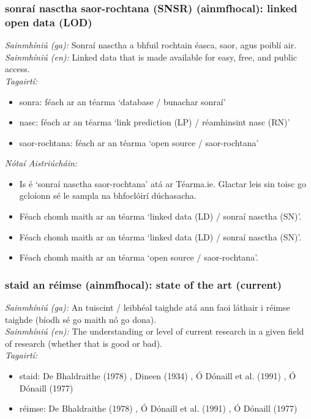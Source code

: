 \subsubsection*{sonraí nasctha saor-rochtana (SNSR) (ainmfhocal): linked open data (LOD)}
 \noindent \textit{Sainmhíniú (ga):} Sonraí nasctha a bhfuil rochtain éasca, saor, agus poiblí air.
\\
 \noindent \textit{Sainmhíniú (en):} Linked data that is made available for easy, free, and public access.
\\
 \noindent \textit{Tagairtí:}
\begin{itemize}
	\item sonra: féach ar an téarma `database / bunachar sonraí'
	\item nasc: féach ar an téarma `link prediction (LP) / réamhinsint nasc (RN)'
	\item saor-rochtana: féach ar an téarma `open source / saor-rochtana'
\end{itemize}

 \noindent \textit{Nótaí Aistriúcháin:}
\begin{itemize}
	\item Is é `sonraí nasctha saor-rochtana' atá ar Téarma.ie. Glactar leis sin toisc go gcloíonn sé le sampla na bhfoclóirí dúchasacha.
	\item Féach chomh maith ar an téarma `linked data (LD) / sonraí nasctha (SN)'.
	\item Féach chomh maith ar an téarma `linked data (LD) / sonraí nasctha (SN)'.
	\item Féach chomh maith ar an téarma `open source / saor-rochtana'.
\end{itemize}


\subsubsection*{staid an réimse (ainmfhocal): state of the art (current)}
 \noindent \textit{Sainmhíniú (ga):} An tuiscint / leibhéal taighde atá ann faoi láthair i réimse taighde (bíodh sé go maith nó go dona).
\\
 \noindent \textit{Sainmhíniú (en):} The understanding or level of current research in a given field of research (whether that is good or bad).
\\
 \noindent \textit{Tagairtí:}
\begin{itemize}
	\item staid: De Bhaldraithe (1978) \cite{de-bhaldraithe}, Dineen (1934) \cite{dineen}, Ó Dónaill et al. (1991) \cite{focloir-beag}, Ó Dónaill (1977) \cite{odonaill}
	\item réimse: De Bhaldraithe (1978) \cite{de-bhaldraithe}, Ó Dónaill et al. (1991) \cite{focloir-beag}, Ó Dónaill (1977) \cite{odonaill}
\end{itemize}

